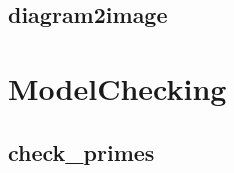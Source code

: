 \documentclass[letterpaper,10pt,english]{sphinxmanual}
\begin{document}
\subsection{diagram2image}
\label{Basins:diagram2image}\label{Basins:id5}

\section{ModelChecking}
\label{ModelChecking::doc}\label{ModelChecking:modelchecking}\label{ModelChecking:id1}

\subsection{check\_primes}
\label{ModelChecking:id2}\label{ModelChecking:check-primes}
\end{document}
